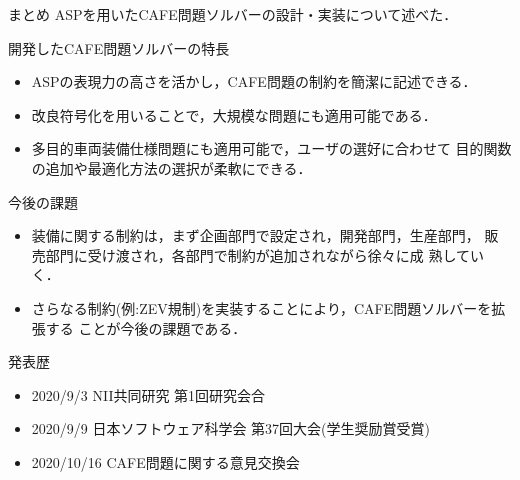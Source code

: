 \documentclass[dvipdfmx, 11pt]{beamer}
\begin{document}
\begin{frame}{まとめ}
ASPを用いたCAFE問題ソルバーの設計・実装について述べた．
\begin{alertblock}{開発したCAFE問題ソルバーの特長}
   \begin{itemize}
   \item {}
	 ASPの表現力の高さを活かし，CAFE問題の制約を簡潔に記述できる．
   \item {}
	 改良符号化を用いることで，大規模な問題にも適用可能である．
   \item {}
	 多目的車両装備仕様問題にも適用可能で，ユーザの選好に合わせて
	 目的関数の追加や最適化方法の選択が柔軟にできる．
   \end{itemize}
\end{alertblock}
\begin{block}{今後の課題}
\begin{itemize}
\item 装備に関する制約は，まず企画部門で設定され，開発部門，生産部門，
  販売部門に受け渡され，各部門で制約が追加されながら徐々に成
  熟していく．
\item さらなる制約(例:ZEV規制)を実装することにより，CAFE問題ソルバーを拡張する
  ことが今後の課題である．
\end{itemize}
 
\end{block}
\end{frame}
\begin{frame}{発表歴}
 \begin{itemize}
  \item 2020/9/3 NII共同研究 第1回研究会合
  \item 2020/9/9 日本ソフトウェア科学会 第37回大会(学生奨励賞受賞)
  \item 2020/10/16 CAFE問題に関する意見交換会
 \end{itemize} 
\end{frame}
\end{document}

